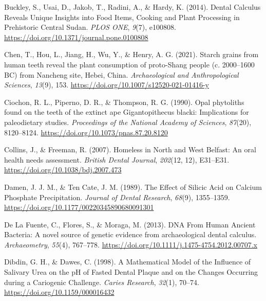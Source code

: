 \documentclass[
  letterpaper,
]{book}
\newlength{\cslhangindent}
\newlength{\cslentryspacingunit} %
\newenvironment{CSLReferences}[2] %
 {%
  \setlength{\parindent}{0pt}
  \ifodd #1
  \let\oldpar\par
  \def\par{\hangindent=\cslhangindent\oldpar}
  \fi
  \setlength{\parskip}{#2\cslentryspacingunit}
 }%
 {}
\begin{document}
\begin{CSLReferences}{1}{0}
\leavevmode{}%
Buckley, S., Usai, D., Jakob, T., Radini, A., \& Hardy, K. (2014).
Dental {Calculus Reveals Unique Insights} into {Food Items}, {Cooking}
and {Plant Processing} in {Prehistoric Central Sudan}. \emph{PLOS ONE},
\emph{9}(7), e100808. \url{https://doi.org/10.1371/journal.pone.0100808}

\leavevmode{}%
Chen, T., Hou, L., Jiang, H., Wu, Y., \& Henry, A. G. (2021). Starch
grains from human teeth reveal the plant consumption of proto-{Shang}
people (c. 2000--1600 {BC}) from {Nancheng} site, {Hebei}, {China}.
\emph{Archaeological and Anthropological Sciences}, \emph{13}(9), 153.
\url{https://doi.org/10.1007/s12520-021-01416-y}

\leavevmode{}%
Ciochon, R. L., Piperno, D. R., \& Thompson, R. G. (1990). Opal
phytoliths found on the teeth of the extinct ape {Gigantopithecus}
blacki: Implications for paleodietary studies. \emph{Proceedings of the
National Academy of Sciences}, \emph{87}(20), 8120--8124.
\url{https://doi.org/10.1073/pnas.87.20.8120}

\leavevmode{}%
Collins, J., \& Freeman, R. (2007). Homeless in {North} and {West
Belfast}: An oral health needs assessment. \emph{British Dental
Journal}, \emph{202}(12, 12), E31--E31.
\url{https://doi.org/10.1038/bdj.2007.473}

\leavevmode{}%
Damen, J. J. M., \& Ten Cate, J. M. (1989). The {Effect} of {Silicic
Acid} on {Calcium Phosphate Precipitation}. \emph{Journal of Dental
Research}, \emph{68}(9), 1355--1359.
\url{https://doi.org/10.1177/00220345890680091301}

\leavevmode{}%
De La Fuente, C., Flores, S., \& Moraga, M. (2013). {DNA From Human
Ancient Bacteria}: {A} novel source of genetic evidence from
archaeological dental calculus. \emph{Archaeometry}, \emph{55}(4),
767--778. \url{https://doi.org/10.1111/j.1475-4754.2012.00707.x}

\leavevmode{}%
Dibdin, G. H., \& Dawes, C. (1998). A {Mathematical Model} of the
{Influence} of {Salivary Urea} on the {pH} of {Fasted Dental Plaque} and
on the {Changes Occurring} during a {Cariogenic Challenge}. \emph{Caries
Research}, \emph{32}(1), 70--74. \url{https://doi.org/10.1159/000016432}


\end{CSLReferences}
\end{document}
